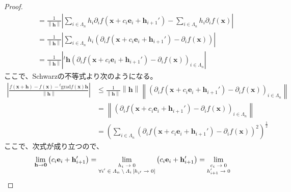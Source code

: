 \documentclass[dvipdfmx]{jsarticle}
\begin{document}
\begin{proof}
\begin{align*}
&= \frac{1}{\left\| \mathbf{h} \right\|}\left| \sum_{i \in \varLambda_{n}} {h_{i}\partial_{i}f\left( \mathbf{x} + c_{i}\mathbf{e}_{i} + \mathbf{h}_{i + 1}' \right)} - \sum_{i \in \varLambda_{n}} {h_{i}\partial_{i}f\left( \mathbf{x} \right)} \right|\\
&= \frac{1}{\left\| \mathbf{h} \right\|}\left| \sum_{i \in \varLambda_{n}} {h_{i}\left( \partial_{i}f\left( \mathbf{x} + c_{i}\mathbf{e}_{i} + \mathbf{h}_{i + 1}' \right) - \partial_{i}f\left( \mathbf{x} \right) \right)} \right|\\
&= \frac{1}{\left\| \mathbf{h} \right\|}\left|{}^{t}\mathbf{h}\left( \partial_{i}f\left( \mathbf{x} + c_{i}\mathbf{e}_{i} + \mathbf{h}_{i + 1}' \right) - \partial_{i}f\left( \mathbf{x} \right) \right)_{i \in \varLambda_{n}} \right|
\end{align*}
ここで、Schwarzの不等式より次のようになる。
\begin{align*}
\left| \frac{f\left( \mathbf{x} + \mathbf{h} \right) - f\left( \mathbf{x} \right) -{}^{t}\mathrm{grad}f\left( \mathbf{x} \right)\mathbf{h}}{\left\| \mathbf{h} \right\|} \right| &\leq \frac{1}{\left\| \mathbf{h} \right\|}\left\| \mathbf{h} \right\|\left\| \left( \partial_{i}f\left( \mathbf{x} + c_{i}\mathbf{e}_{i} + \mathbf{h}_{i + 1}' \right) - \partial_{i}f\left( \mathbf{x} \right) \right)_{i \in \varLambda_{n}} \right\|\\
&= \left\| \left( \partial_{i}f\left( \mathbf{x} + c_{i}\mathbf{e}_{i} + \mathbf{h}_{i + 1}' \right) - \partial_{i}f\left( \mathbf{x} \right) \right)_{i \in \varLambda_{n}} \right\|\\
&= \left( \sum_{i \in \varLambda_{n}} \left( \partial_{i}f\left( \mathbf{x} + c_{i}\mathbf{e}_{i} + \mathbf{h}_{i + 1}' \right) - \partial_{i}f\left( \mathbf{x} \right) \right)^{2} \right)^{\frac{1}{2}}
\end{align*}
ここで、次式が成り立つので、
\begin{align*}
\lim_{\mathbf{h} \rightarrow \mathbf{0}}\left( c_{i}\mathbf{e}_{i} + \mathbf{h}_{i + 1}' \right) = \lim_{\scriptsize \begin{matrix}
h_{i} \rightarrow 0 \\
\forall i' \in \varLambda_{n} \setminus \varLambda_{i}\left[ h_{i'} \rightarrow 0 \right] \\
\end{matrix}}\left( c_{i}\mathbf{e}_{i} + \mathbf{h}_{i + 1}' \right) = \lim_{\scriptsize \begin{matrix}
c_{i} \rightarrow 0 \\
h_{i + 1}' \rightarrow 0 \\

\end{matrix}}
\end{align*}
\end{proof}
\end{document}
